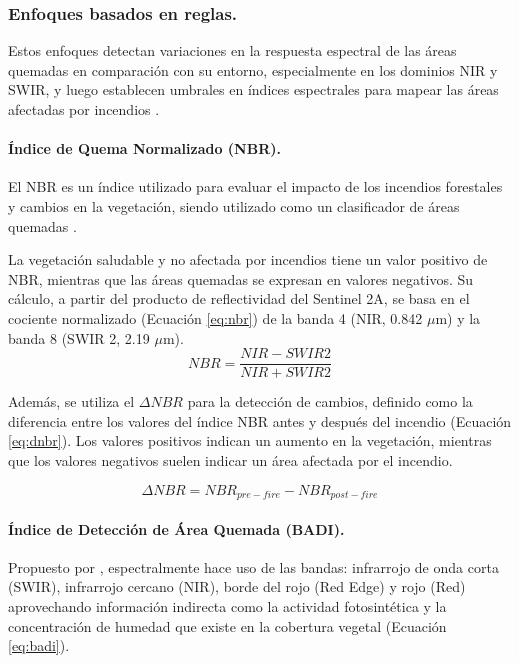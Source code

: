 \subsubsection{Enfoques basados en reglas.}
Estos enfoques detectan variaciones en la respuesta espectral de las áreas quemadas en comparación con su entorno, especialmente 
en los dominios NIR y SWIR, y luego establecen umbrales en índices espectrales para mapear las áreas afectadas por incendios \citep{knopp_deep_2020}.

\paragraph{Índice de Quema Normalizado (NBR).}
El NBR es un índice utilizado para evaluar el impacto de los incendios forestales y cambios en la vegetación, siendo 
utilizado como un clasificador de áreas quemadas \citep{ongeri_burnt_2020}.

La vegetación saludable y no afectada por incendios tiene un valor positivo de NBR, mientras que las áreas quemadas 
se expresan en valores negativos. Su cálculo, a partir del producto de reflectividad del Sentinel 2A, se basa en el 
cociente normalizado (Ecuación \ref{eq:nbr}) de la banda 4 (NIR, 0.842 $\mu$m) y la banda 8 (SWIR 2, 2.19 $\mu$m).
\begin{equation}
    NBR = \frac{NIR - SWIR2}{NIR + SWIR2}
    \label{eq:nbr}
\end{equation}

Además, se utiliza el $\Delta NBR$ para la detección de cambios, definido como la diferencia entre los valores del índice NBR antes y después del incendio 
(Ecuación \ref{eq:dnbr}). Los valores positivos indican un aumento en la vegetación, mientras que los valores negativos suelen indicar un área afectada por el incendio.

\begin{equation}
    \Delta NBR = NBR_{pre-fire} - NBR_{post-fire}
    \label{eq:dnbr}
\end{equation}

\paragraph{Índice de Detección de Área Quemada (BADI).}
Propuesto por \citet{farhadi_badi_2023}, espectralmente hace uso de las bandas: infrarrojo de onda corta (SWIR), infrarrojo cercano (NIR), 
borde del rojo (Red Edge) y rojo (Red) aprovechando información indirecta como la actividad fotosintética y la concentración de humedad 
que existe en la cobertura vegetal (Ecuación \ref{eq:badi}). 

